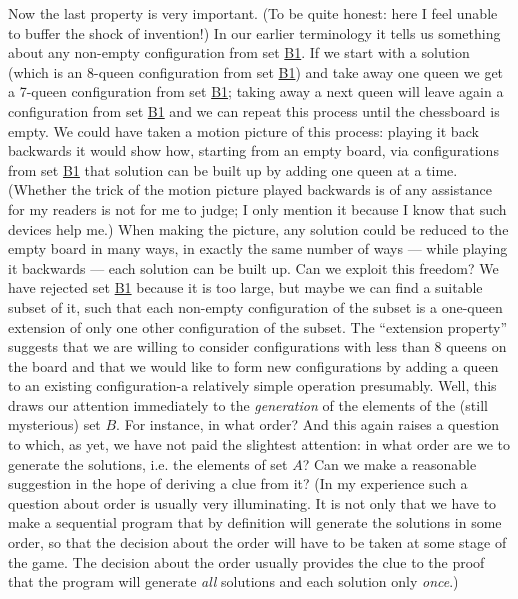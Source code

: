 Now the last property is very important. (To be quite honest: here I feel unable to buffer the shock of invention!) In our earlier terminology it tells us something about any non-empty configuration from set \hyperref[en:b1-eight-queens]{B1}. If we start with a solution (which is an 8-queen configuration from set \hyperref[en:b1-eight-queens]{B1}) and take away one queen we get a 7-queen configuration from set \hyperref[en:b1-eight-queens]{B1}; taking away a next queen will leave again a configuration from set \hyperref[en:b1-eight-queens]{B1} and we can repeat this process until the chessboard is empty. We could have taken a motion picture of this process: playing it back backwards it would show how, starting from an empty board, via configurations from set \hyperref[en:b1-eight-queens]{B1} that solution can be built up by adding one queen at a time. (Whether the trick of the motion picture played backwards is of any assistance for my readers is not for me to judge; I only mention it because I know that such devices help me.) When making the picture, any solution could be reduced to the empty board in many ways, in exactly the same number of ways --- while playing it backwards --- each solution can be built up. Can we exploit this freedom? We have rejected set \hyperref[en:b1-eight-queens]{B1} because it is too large, but maybe we can find a suitable subset of it, such that each non-empty configuration of the subset is a one-queen extension of only one other configuration of the subset. The ``extension property'' suggests that we are willing to consider configurations with less than 8 queens on the board and that we would like to form new configurations by adding a queen to an existing configuration-a relatively simple operation presumably. Well, this draws our attention immediately to the \textit{generation} of the elements of the (still mysterious) set $B$. For instance, in what order? And this again raises a question to which, as yet, we have not paid the slightest attention: in what order are we to generate the solutions, i.e. the elements of set $A$? Can we make a reasonable suggestion in the hope of deriving a clue from it? (In my experience such a question about order is usually very illuminating. It is not only that we have to make a sequential program that by definition will generate the solutions in some order, so that the decision about the order will have to be taken at some stage of the game. The decision about the order usually provides the clue to the proof that the program will generate \textit{all} solutions and each solution only \textit{once}.)

